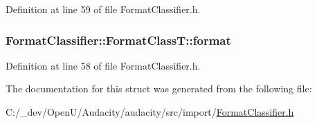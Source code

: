 Definition at line 59 of file Format\+Classifier.\+h.

\subsubsection[{\texorpdfstring{format}{format}}]{ Format\+Classifier\+::\+Format\+Class\+T\+::format}\hypertarget{struct_format_classifier_1_1_format_class_t_a743513705fe5c9a27547960c6be030ca}{}\label{struct_format_classifier_1_1_format_class_t_a743513705fe5c9a27547960c6be030ca}


Definition at line 58 of file Format\+Classifier.\+h.



The documentation for this struct was generated from the following file\+:\begin{DoxyCompactItemize}
\item 
C\+:/\+\_\+dev/\+Open\+U/\+Audacity/audacity/src/import/\hyperlink{_format_classifier_8h}{Format\+Classifier.\+h}\end{DoxyCompactItemize}
